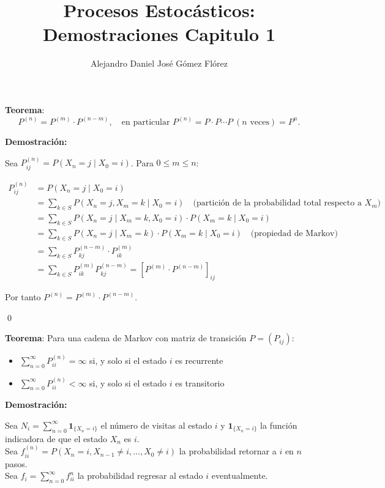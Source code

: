 \documentclass[12pt,a4paper]{article}
\title{Procesos Estocásticos: Demostraciones Capitulo 1}
\author{Alejandro Daniel José Gómez Flórez}
\date{}
\newcommand{\teorema}[1]{%
\begin{teoremabox}
\textbf{Teorema}: #1
\end{teoremabox}
}
\begin{document}
\maketitle

\teorema{
\begin{equation*}
P^{(n)} = P^{(m)} \cdot P^{(n-m)}, \quad \text{en particular } P^{(n)} = P \cdot P \cdots P \ (\text{$n$ veces}) = P^n.
\end{equation*}}

\textbf{Demostración:}

Sea $P_{ij}^{(n)} = P(X_n = j \mid X_0 = i)$. Para $0 \leq m \leq n$:

\begin{align*}
P_{ij}^{(n)} &= P(X_n = j \mid X_0 = i) \\
&= \sum_{k \in S} P(X_n = j, X_m = k \mid X_0 = i) \quad \text{(partición de la probabilidad total respecto a $X_m$)} \\
&= \sum_{k \in S} P(X_n = j \mid X_m = k, X_0 = i) \cdot P(X_m = k \mid X_0 = i) \\
&= \sum_{k \in S} P(X_n = j \mid X_m = k) \cdot P(X_m = k \mid X_0 = i) \quad \text{(propiedad de Markov)} \\
&= \sum_{k \in S} P_{kj}^{(n-m)} \cdot P_{ik}^{(m)} \\
&= \sum_{k \in S} P_{ik}^{(m)} P_{kj}^{(n-m)} = [P^{(m)} \cdot P^{(n-m)}]_{ij}
\end{align*}

Por tanto $P^{(n)} = P^{(m)} \cdot P^{(n-m)}$.

\qed


\teorema{Para una cadena de Markov con matriz de transición $P = (P_{ij})$:
\begin{itemize}
    \item $\sum_{n=0}^{\infty} P_{ii}^{(n)} = \infty$ si, y solo si el estado $i$ es recurrente
    \item $\sum_{n=0}^{\infty} P_{ii}^{(n)} < \infty$ si, y solo si el estado $i$ es transitorio
\end{itemize}}

\textbf{Demostración:}

Sea $N_i = \sum_{n=0}^{\infty} \mathbf{1}_{\{X_n = i\}}$ el número de visitas al estado $i$ y $\mathbf{1}_{\{X_n = i\}}$ la función indicadora de que el estado $X_n$ es $i$. \\
Sea $f^{(n)}_{ii} = P(X_n = i, X_{n-1} \neq i, \ldots, X_0 \neq i)$ la probabilidad retornar a $i$ en $n$ pasos.\\
Sea $f_{i} = \sum_{n=0}^{\infty} f^{n}_{ii}$ la probabilidad regresar al estado $i$ eventualmente.
\end{document}

